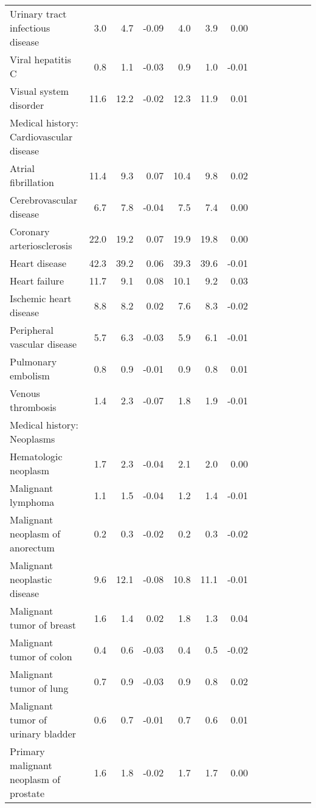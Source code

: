 \documentclass[11pt,]{article}
\begin{document}
\begin{longtable}{lrrrrrrrrrrrr}
      Urinary tract infectious disease &  3.0 &  4.7 & -0.09 &  4.0 &  3.9 &  0.00 \\ 
      Viral hepatitis C &  0.8 &  1.1 & -0.03 &  0.9 &  1.0 & -0.01 \\ 
      Visual system disorder & 11.6 & 12.2 & -0.02 & 12.3 & 11.9 &  0.01 \\ 
  Medical history: Cardiovascular disease &    &    &     &    &    &     \\ 
      Atrial fibrillation & 11.4 &  9.3 &  0.07 & 10.4 &  9.8 &  0.02 \\ 
      Cerebrovascular disease &  6.7 &  7.8 & -0.04 &  7.5 &  7.4 &  0.00 \\ 
      Coronary arteriosclerosis & 22.0 & 19.2 &  0.07 & 19.9 & 19.8 &  0.00 \\ 
      Heart disease & 42.3 & 39.2 &  0.06 & 39.3 & 39.6 & -0.01 \\ 
      Heart failure & 11.7 &  9.1 &  0.08 & 10.1 &  9.2 &  0.03 \\ 
      Ischemic heart disease &  8.8 &  8.2 &  0.02 &  7.6 &  8.3 & -0.02 \\ 
      Peripheral vascular disease &  5.7 &  6.3 & -0.03 &  5.9 &  6.1 & -0.01 \\ 
      Pulmonary embolism &  0.8 &  0.9 & -0.01 &  0.9 &  0.8 &  0.01 \\ 
      Venous thrombosis &  1.4 &  2.3 & -0.07 &  1.8 &  1.9 & -0.01 \\ 
  Medical history: Neoplasms &    &    &     &    &    &     \\ 
      Hematologic neoplasm &  1.7 &  2.3 & -0.04 &  2.1 &  2.0 &  0.00 \\ 
      Malignant lymphoma &  1.1 &  1.5 & -0.04 &  1.2 &  1.4 & -0.01 \\ 
      Malignant neoplasm of anorectum &  0.2 &  0.3 & -0.02 &  0.2 &  0.3 & -0.02 \\ 
      Malignant neoplastic disease &  9.6 & 12.1 & -0.08 & 10.8 & 11.1 & -0.01 \\ 
      Malignant tumor of breast &  1.6 &  1.4 &  0.02 &  1.8 &  1.3 &  0.04 \\ 
      Malignant tumor of colon &  0.4 &  0.6 & -0.03 &  0.4 &  0.5 & -0.02 \\ 
      Malignant tumor of lung &  0.7 &  0.9 & -0.03 &  0.9 &  0.8 &  0.02 \\ 
      Malignant tumor of urinary bladder &  0.6 &  0.7 & -0.01 &  0.7 &  0.6 &  0.01 \\ 
      Primary malignant neoplasm of prostate &  1.6 &  1.8 & -0.02 &  1.7 &  1.7 &  0.00 \\ 

\end{longtable}
\end{document}
